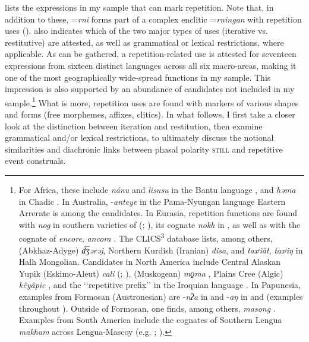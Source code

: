  lists the expressions in my sample that can mark repetition. Note that, in addition to these,  \mbox{=\textit{rni}} forms part of a complex enclitic \mbox{=\textit{rningan}} with repetition uses ().  also indicates which of the two major types of uses (iterative vs. restitutive) are attested, as well as grammatical or lexical restrictions, where applicable. As can be gathered, a repetition-related use is attested for seventeen expressions from sixteen distinct languages across all six macro-areas, making it one of the most geographically wide-spread functions in my sample. This impression is also supported by an abundance of candidates not included in my sample.\footnote{For Africa, these include \textit{nánu} and \textit{lisusu} in the Bantu language  \parencite{NassensteinPasch2021}, and  \textit{həma} in Chadic  \parencite[259–260]{Wolff2015}. In Australia,  \mbox{-\textit{anteye}} in the Pama-Nyungan language Eastern Arrernte \parencite[351]{Wilkins1989} is among the candidates. In Eurasia, repetition functions are found with \textit{nog} in southern varieties of  (\cite{vanderAuwera1993}; \cite[42 fn3]{vanBaar1997}), its cognate \textit{nokh} in  \parencite{vanderAuwera1991Yiddish}, as well as with the  cognate of  \textit{encore}, \textit{ancora} \parencite{TovenaDonazzan2008}. The CLICS\textsuperscript{3} database \parencite{CLICS3} lists, among others,  (Abkhaz-Adyge) \textit{d͡ʒərəj}, Northern Kurdish (Iranian) \textit{disa}, and \textit{taxʲiăt}, \textit{taxʲiŋ} in Halh Mongolian. Candidates in North America include Central Alaskan Yupik (Eskimo-Aleut) \textit{cali} (\cite[55, 66]{Amos2003}; \cite[1535]{Miyaoka2012}),  (Muskogean) \textit{mo̠ma} \parencite[316–317]{Broadwell2006}, Plains Cree (Algic) \textit{kêyâpic} \parencite[s.v. \textit{kêyâpic}]{Wolvengray2001}, and the \lq\lq repetitive prefix\rq\rq{ }in the Iroquian language  \parencite[38–39]{Chafe2015}. In Papunesia, examples from Formosan (Austronesian) are \mbox{-\textit{nʔa}} in  and \mbox{-\textit{aŋ}} in  and  (examples throughout \cite{ZeitounEtal2010}). Outside of Formosan, one finds, among others,  \textit{masong} \parencite{Goudswaard2005}. Examples from South America include the cognates of Southern Lengua \textit{makham} across Lengua-Mascoy (e.g. \cite [79]{UnruhKalisch1999}; \cite[317]{UnruhEtAl2003}).} What is more, repetition uses are found with markers of various shapes and forms (free morphemes, affixes, clitics). In what follows, I first take a closer look at the distinction between iteration and restitution, then examine grammatical and/or lexical restrictions, to ultimately discuss the notional similarities and diachronic links between phasal polarity \textsc{still} and repetitive event construals.


